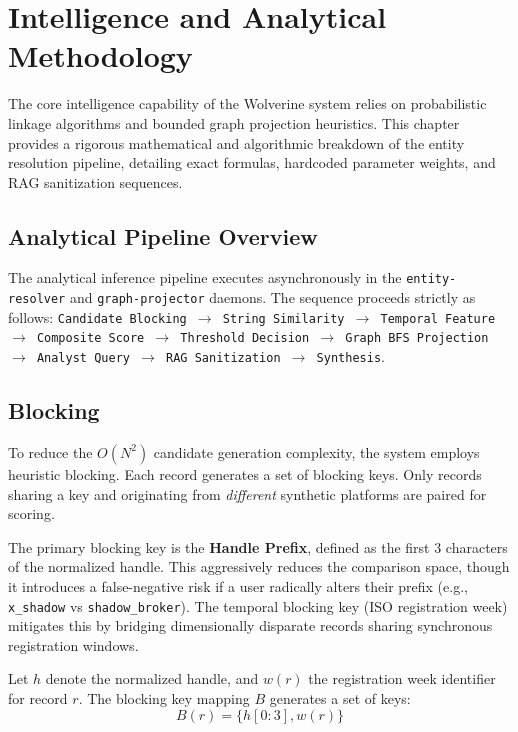 \chapter{Intelligence and Analytical Methodology}
\label{ch:analytical-methodology}

The core intelligence capability of the Wolverine system relies on probabilistic linkage algorithms 
and bounded graph projection heuristics. This chapter provides a rigorous mathematical and algorithmic 
breakdown of the entity resolution pipeline, detailing exact formulas, hardcoded parameter weights, 
and RAG sanitization sequences.

\section{Analytical Pipeline Overview}
\label{sec:meth-overview}
The analytical inference pipeline executes asynchronously in the \texttt{entity-resolver} and 
\texttt{graph-projector} daemons. The sequence proceeds strictly as follows:
\texttt{Candidate Blocking $\rightarrow$ String Similarity $\rightarrow$ Temporal Feature 
$\rightarrow$ Composite Score $\rightarrow$ Threshold Decision $\rightarrow$ Graph BFS Projection 
$\rightarrow$ Analyst Query $\rightarrow$ RAG Sanitization $\rightarrow$ Synthesis}.

\section{Blocking}
\label{sec:meth-blocking}
To reduce the $O(N^2)$ candidate generation complexity, the system employs heuristic blocking. 
Each record generates a set of blocking keys. Only records sharing a key and originating from 
\textit{different} synthetic platforms are paired for scoring.

The primary blocking key is the \textbf{Handle Prefix}, defined as the first 3 characters 
of the normalized handle. This aggressively reduces the comparison space, though it introduces 
a false-negative risk if a user radically alters their prefix (e.g., \texttt{x\_shadow} vs 
\texttt{shadow\_broker}). The temporal blocking key (ISO registration week) mitigates this by 
bridging dimensionally disparate records sharing synchronous registration windows.

Let $h$ denote the normalized handle, and $w(r)$ the registration week identifier for record $r$. 
The blocking key mapping $B$ generates a set of keys:
\begin{equation}
B(r) = \{ h[0:3], w(r) \}
\label{eq:blocking}
\end{equation}

